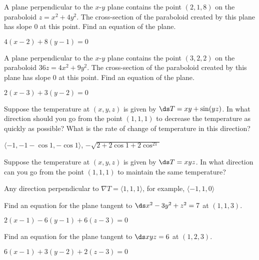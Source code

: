 \begin{exercises}
\begin{exercise} A plane perpendicular to the $x$-$y$ plane contains the
point $(2,1,8)$ on the paraboloid $z=x^2+4y^2$. The cross-section of
the paraboloid created by this plane has slope 0 at this point. Find
an equation of the plane.
\begin{answer} $4(x-2)+8(y-1)=0$
\end{answer}\end{exercise}

\begin{exercise} A plane perpendicular to the $x$-$y$ plane contains the
point $(3,2,2)$ on the paraboloid $36z=4x^2+9y^2$. The cross-section
of the paraboloid created by this plane has slope 0 at this point.
Find an equation of the plane.
\begin{answer} $2(x-3)+3(y-2)=0$
\end{answer}\end{exercise}

\begin{exercise} Suppose the temperature at $(x,y,z)$ is given by 
$\ds T=xy+\sin(yz)$. In what direction should you go from the point 
$(1,1,1)$ to decrease the temperature as quickly as possible? What is
the rate of change of temperature in this direction?
\begin{answer} $\langle -1,-1-\cos1,-\cos1\rangle$, $-\sqrt{2+2\cos1+2\cos^21}$
\end{answer}\end{exercise}

\begin{exercise} Suppose the temperature at $(x,y,z)$ is given by 
$\ds T=xyz$. In what direction can you go from the point 
$(1,1,1)$ to maintain the same temperature?
\begin{answer} Any direction perpendicular to $\nabla T=\langle
1,1,1\rangle$,
for example, $\langle -1,1,0\rangle$
\end{answer}\end{exercise}

\begin{exercise} Find an equation for the plane tangent to 
$\ds x^2-3y^2+z^2=7$ at $(1,1,3)$.
\begin{answer} $2(x-1)-6(y-1)+6(z-3)=0$
\end{answer}\end{exercise}

\begin{exercise} Find an equation for the plane tangent to 
$\ds xyz=6$ at $(1,2,3)$.
\begin{answer} $6(x-1)+3(y-2)+2(z-3)=0$
\end{answer}\end{exercise}


\end{exercises}
